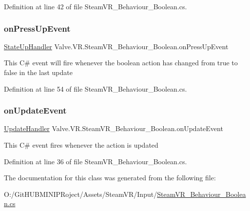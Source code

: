 Definition at line 42 of file Steam\+V\+R\+\_\+\+Behaviour\+\_\+\+Boolean.\+cs.

\mbox{\label{class_valve_1_1_v_r_1_1_steam_v_r___behaviour___boolean_a25f59fa151fdd77e1856c1d567d8fa59}} 
\subsubsection{\texorpdfstring{onPressUpEvent}{onPressUpEvent}}
{\footnotesize\ttfamily \mbox{\hyperlink{class_valve_1_1_v_r_1_1_steam_v_r___behaviour___boolean_a6ac1e6383124de89a78d25b5f453bab7}{State\+Up\+Handler}} Valve.\+V\+R.\+Steam\+V\+R\+\_\+\+Behaviour\+\_\+\+Boolean.\+on\+Press\+Up\+Event}



This C\# event will fire whenever the boolean action has changed from true to false in the last update 



Definition at line 54 of file Steam\+V\+R\+\_\+\+Behaviour\+\_\+\+Boolean.\+cs.

\mbox{\label{class_valve_1_1_v_r_1_1_steam_v_r___behaviour___boolean_af7987bf6d371d204514044c91b1a2e8f}} 
\subsubsection{\texorpdfstring{onUpdateEvent}{onUpdateEvent}}
{\footnotesize\ttfamily \mbox{\hyperlink{class_valve_1_1_v_r_1_1_steam_v_r___behaviour___boolean_ae98c73afb05e760178c435aa4baa175c}{Update\+Handler}} Valve.\+V\+R.\+Steam\+V\+R\+\_\+\+Behaviour\+\_\+\+Boolean.\+on\+Update\+Event}



This C\# event fires whenever the action is updated 



Definition at line 36 of file Steam\+V\+R\+\_\+\+Behaviour\+\_\+\+Boolean.\+cs.



The documentation for this class was generated from the following file\+:\begin{DoxyCompactItemize}
\item 
O\+:/\+Git\+H\+U\+B\+M\+I\+N\+I\+P\+Roject/\+Assets/\+Steam\+V\+R/\+Input/\mbox{\hyperlink{_steam_v_r___behaviour___boolean_8cs}{Steam\+V\+R\+\_\+\+Behaviour\+\_\+\+Boolean.\+cs}}\end{DoxyCompactItemize}
